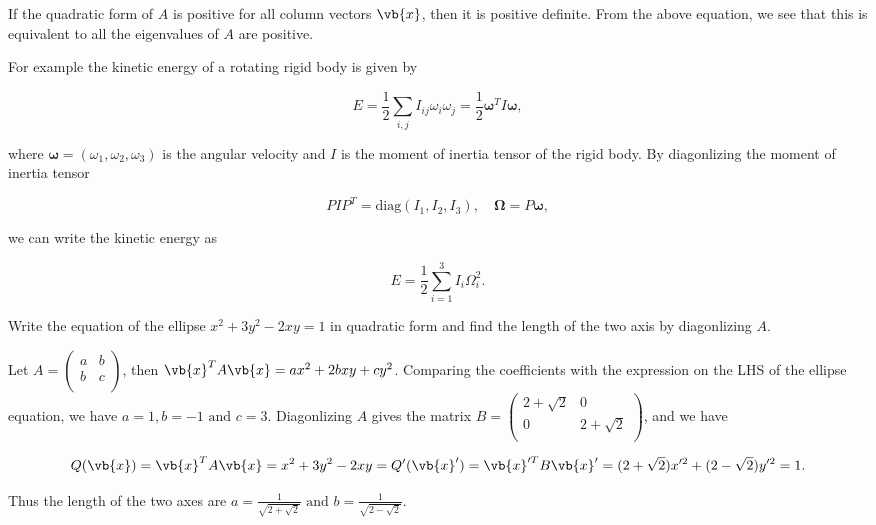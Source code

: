 \documentclass[a4paper,12pt]{report}
\begin{document}
If the quadratic form of \(A\) is positive for all column vectors \(\vb{x} \), then it is positive definite. From the above equation, we see that this is equivalent to all the eigenvalues of \(A\) are positive.  

For example the kinetic energy of a rotating rigid body is given by 

\begin{equation}
    E = \frac{1}{2} \sum_{i,j}^{} I_{ij}\omega _{i}\omega _{j} = \frac{1}{2} \boldsymbol{\omega }^T I \boldsymbol{\omega },      
\end{equation}

where \(\boldsymbol{\omega } = (\omega _{1}, \omega _{2},\omega _{3}   ) \) is the angular velocity and \(I\) is the moment of inertia tensor of the rigid body. By diagonlizing the moment of inertia tensor 

\begin{equation}
    PIP^T = \text{diag}(I_1 ,I_2 ,I_3 ), \quad \boldsymbol{\Omega } = P \boldsymbol{\omega },   
\end{equation}

we can write the kinetic energy as 

\begin{equation}
    E = \frac{1}{2} \sum_{i=1}^{3} I_{i}\Omega _{i}^2.  
\end{equation}

{Write the equation of the ellipse \(x^2+3y^2-2xy=1\) in quadratic form and find the length of the two axis by diagonlizing \(A\). }
{Let \(A = \begin{pmatrix}
    a &  b \\
    b &  c \\
\end{pmatrix}\), then \(\vb{x} ^TA\vb{x} = ax^2 + 2bxy + cy^2\). Comparing the coefficients with the expression on the LHS of the ellipse equation, we have \(a = 1, b = -1 \text { and } c = 3\). Diagonlizing \(A\) gives the matrix \(B = \begin{pmatrix}
    2+\sqrt{2}  & 0  \\
    0 & 2+\sqrt{2}   \\
\end{pmatrix}\), and we have 

\begin{equation}
    Q(\vb{x} ) = \vb{x} ^TA\vb{x} = x^2+3y^2-2xy = Q'(\vb{x} ') = \vb{x} '^TB\vb{x} '= (2+\sqrt{2} )x'^2+(2-\sqrt{2} )y'^2 = 1.
\end{equation}

Thus the length of the two axes are \(a = \frac{1}{\sqrt{2+\sqrt{2 } }} \text { and } b = \frac{1}{\sqrt{2-\sqrt{2} } }  \). 
} 
\end{document}
